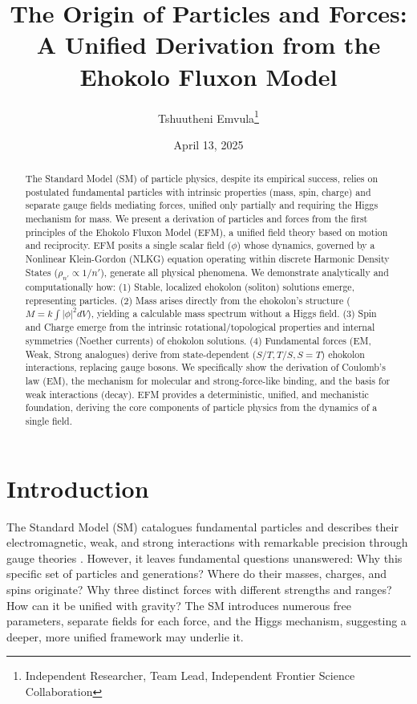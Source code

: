 \documentclass[11pt]{article}
\title{The Origin of Particles and Forces: A Unified Derivation from the Ehokolo Fluxon Model}
\author{Tshuutheni Emvula\thanks{Independent Researcher, Team Lead, Independent Frontier Science Collaboration}}
\date{April 13, 2025}
\begin{document}
\maketitle

\begin{abstract}
The Standard Model (SM) of particle physics, despite its empirical success, relies on postulated fundamental particles with intrinsic properties (mass, spin, charge) and separate gauge fields mediating forces, unified only partially and requiring the Higgs mechanism for mass. We present a derivation of particles and forces from the first principles of the Ehokolo Fluxon Model (EFM), a unified field theory based on motion and reciprocity. EFM posits a single scalar field (\(\phi\)) whose dynamics, governed by a Nonlinear Klein-Gordon (NLKG) equation operating within discrete Harmonic Density States (\(\rho_{n'} \propto 1/n'\)), generate all physical phenomena. We demonstrate analytically and computationally how: (1) Stable, localized ehokolon (soliton) solutions emerge, representing particles. (2) Mass arises directly from the ehokolon's structure (\(M = k \int |\phi|^2 dV\)), yielding a calculable mass spectrum without a Higgs field. (3) Spin and Charge emerge from the intrinsic rotational/topological properties and internal symmetries (Noether currents) of ehokolon solutions. (4) Fundamental forces (EM, Weak, Strong analogues) derive from state-dependent (\(S/T, T/S, S=T\)) ehokolon interactions, replacing gauge bosons. We specifically show the derivation of Coulomb's law (EM), the mechanism for molecular and strong-force-like binding, and the basis for weak interactions (decay). EFM provides a deterministic, unified, and mechanistic foundation, deriving the core components of particle physics from the dynamics of a single field.
\end{abstract}

\section{Introduction}
The Standard Model (SM) catalogues fundamental particles and describes their electromagnetic, weak, and strong interactions with remarkable precision through gauge theories \cite{SM_Review_Placeholder}. However, it leaves fundamental questions unanswered: Why this specific set of particles and generations? Where do their masses, charges, and spins originate? Why three distinct forces with different strengths and ranges? How can it be unified with gravity? The SM introduces numerous free parameters, separate fields for each force, and the Higgs mechanism, suggesting a deeper, more unified framework may underlie it.
\end{document}
